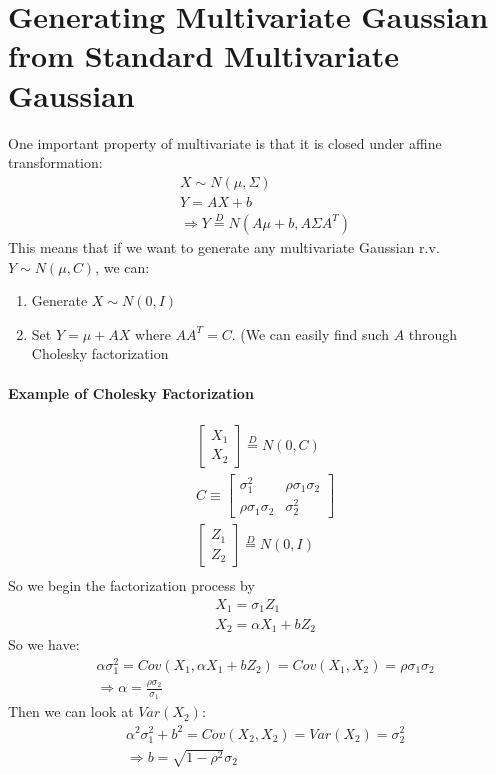 \section{Generating Multivariate Gaussian from Standard Multivariate Gaussian} 
One important property of multivariate is that it is closed under affine transformation: 
    \begin{align*}
        & X \sim N(\mu, \Sigma)  \\
        & Y = AX + b \\
        & \Longrightarrow Y \overset{D}{=}N(A\mu + b, A \Sigma A^T)
    \end{align*}
This means that if we want to generate any multivariate Gaussian r.v. $Y \sim N(\mu, C)$, we can: 
    \begin{enumerate}
        \item Generate $X\sim N(0, I)$
        \item Set $Y = \mu + AX$ where $AA^T = C$. (We can easily find such $A$ through Cholesky factorization
    \end{enumerate}

\paragraph{Example of Cholesky Factorization}
    \begin{align*}
        & \begin{bmatrix}
                X_1 \\ X_2 
        \end{bmatrix} \overset{D}{=}N(0, C) \\
        & C \equiv
            \begin{bmatrix}
                    \sigma_1^2 & \rho \sigma_1 \sigma_2 \\
                    \rho \sigma_1 \sigma_2 & \sigma_2^2
            \end{bmatrix} \\
        & \begin{bmatrix}
                Z_1 \\ Z_2 
        \end{bmatrix} \overset{D}{=}N(0, I) \\
    \end{align*}
So we begin the factorization process by 
    \begin{align*}
        & X_1 = \sigma_1 Z_1 \\
        & X_2 = \alpha X_1 + b Z_2
    \end{align*}
So we have: 
    \begin{align*}
        & \alpha \sigma_1^2 = Cov(X_1, \alpha X_1 + b Z_2) = Cov(X_1, X_2)= \rho \sigma_1 \sigma_2 \\
        & \Longrightarrow \alpha = \frac{\rho \sigma_2}{\sigma_1}
    \end{align*}
Then we can look at $Var(X_2)$: 
    \begin{align*}
        & \alpha^2\sigma_1^2 + b^2 = Cov(X_2, X_2) = Var(X_2) = \sigma_2^2 \\
        & \Longrightarrow b = \sqrt{1 - \rho^2}\sigma_2
    \end{align*}

